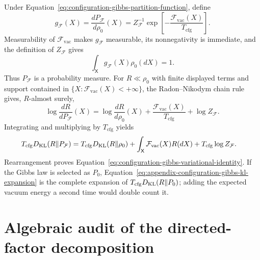 Under Equation~\eqref{eq:configuration-gibbs-partition-function}, define
\begin{equation}
g_{\mathcal F}(X)
=\frac{dP_{\mathcal F}}{d\rho_0}(X)
=Z_{\mathcal F}^{-1}
\exp\left[-\frac{\mathcal F_{\mathrm{vac}}(X)}
{T_{\mathrm{cfg}}}\right].
\label{eq:appendix-configuration-gibbs-density}
\end{equation}
Measurability of \(\mathcal F_{\mathrm{vac}}\) makes \(g_{\mathcal F}\) measurable, its nonnegativity is immediate, and the definition of \(Z_{\mathcal F}\) gives
\begin{equation}
\int_{\mathsf X}g_{\mathcal F}(X)\rho_0(dX)=1.
\label{eq:appendix-configuration-gibbs-normalization}
\end{equation}
Thus \(P_{\mathcal F}\) is a probability measure. For \(R\ll\rho_0\) with finite displayed terms and support contained in \(\{X:\mathcal F_{\mathrm{vac}}(X)<+\infty\}\), the Radon--Nikodym chain rule gives, \(R\)-almost surely,
\begin{equation}
\log\frac{dR}{dP_{\mathcal F}}(X)
=\log\frac{dR}{d\rho_0}(X)
+\frac{\mathcal F_{\mathrm{vac}}(X)}{T_{\mathrm{cfg}}}
+\log Z_{\mathcal F}.
\label{eq:appendix-configuration-gibbs-log-ratio}
\end{equation}
Integrating and multiplying by \(T_{\mathrm{cfg}}\) yields
\begin{align}
T_{\mathrm{cfg}}D_{\mathrm{KL}}(R\Vert P_{\mathcal F})
={}&T_{\mathrm{cfg}}D_{\mathrm{KL}}(R\Vert\rho_0)
+\int_{\mathsf X}\mathcal F_{\mathrm{vac}}(X)R(dX)
+T_{\mathrm{cfg}}\log Z_{\mathcal F}.
\label{eq:appendix-configuration-gibbs-kl-expansion}
\end{align}
Rearrangement proves Equation~\eqref{eq:configuration-gibbs-variational-identity}. If the Gibbs law is selected as \(P_0\), Equation~\eqref{eq:appendix-configuration-gibbs-kl-expansion} is the complete expansion of \(T_{\mathrm{cfg}}D_{\mathrm{KL}}(R\Vert P_0)\); adding the expected vacuum energy a second time would double count it.

\section{Algebraic audit of the directed-factor decomposition}
\label{sec:state-elbo-factor-audit}

